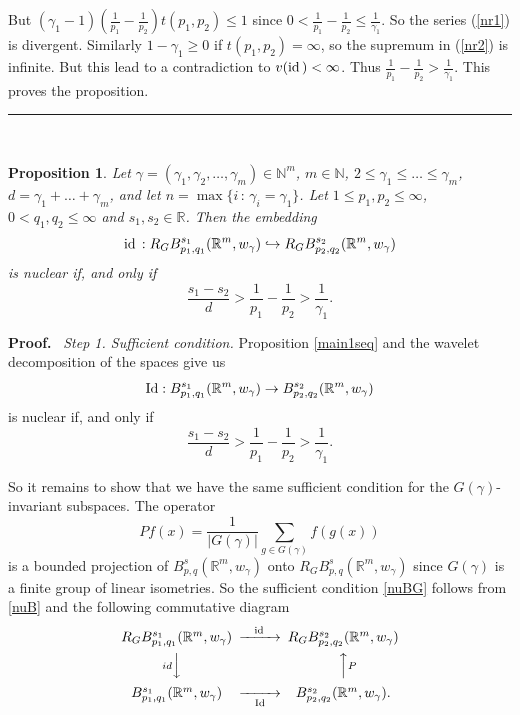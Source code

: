 \documentclass[12pt]{article}
\newtheorem{Prop}{Proposition}
\newcommand{\be}{\begin{equation}}
\newcommand{\ee}{\end{equation}}
\def\id{\mathop{\rm id \,}\nolimits}
\def\Id{\mathop{\rm Id}\nolimits}
\newcommand{\bpr}{{\bf Proof.}\ }
\newcommand{\epr}{\hspace*{\fill}\rule{3mm}{3mm}\\}
\newcommand{\R}{{\mathbb R}}
\newcommand{\N}{{\mathbb N}}
\begin{document}
But $(\gamma_1-1)(\frac{1}{p_1}-\frac{1}{p_2})t(p_1,p_2)\leq 1$ since $0<\frac{1}{p_1}- \frac{1}{p_2}\leq\frac{1}{\gamma_1}$. So the series (\ref{nr1}) is divergent. Similarly $1-\gamma_1\geq 0$ if  $t(p_1,p_2)=\infty$, so the supremum in (\ref{nr2})  is infinite. But this lead to a contradiction to $ v(\id)<\infty$. %
Thus  $\frac{1}{p_1}- \frac{1}{p_2}> \frac{1}{\gamma_1}$.
 This proves the proposition. \epr

\begin{Prop} \label{main1function}
	Let $\gamma= (\gamma_1 , \gamma_2, \ldots , \gamma_m)\in \N^m$, $m\in \N$,   $2\le \gamma_1\le \ldots \le \gamma_m$, %
	$d= \gamma_1+ \ldots + \gamma_m$, and let $n = \max\{ i\,:\, \gamma_i=\gamma_1\}$. 	
	Let $1\le p_1,p_2\le\infty$, $0<q_1,q_2\le \infty$ and  $s_1,s_2\in \R$. Then the embedding 
	\begin{equation*}
	\id :R_G B^{s_1}_{p_1,q_1}(\R^m, w_\gamma) \hookrightarrow R_G B^{s_2}_{p_2,q_2}(\R^m, w_\gamma)
	\end{equation*}
	is nuclear if, and only if
	\be
	\label{nuBG}
 \frac{s_1 - s_2}{d}> \frac{1}{p_1}- \frac{1}{p_2}>\frac{1}{\gamma_{1}}. 
\ee
	
\end{Prop}




\bpr
{\em Step 1.  Sufficient condition.} 
Proposition \ref{main1seq} and the wavelet decomposition of the spaces give us 
	\begin{equation*}
\Id :B^{s_1}_{p_1,q_1}(\R^m, w_\gamma)\rightarrow B^{s_2}_{p_2,q_2}(\R^m, w_\gamma)
\end{equation*}
is nuclear if, and only if
\be
\label{nuB}
 \frac{s_1 - s_2}{d}> \frac{1}{p_1}- \frac{1}{p_2}>\frac{1}{\gamma_{1}}. 
\ee


So it remains to show that we have the same sufficient condition for the $G(\gamma)$-invariant subspaces. The operator 
$$
P f (x)= \frac{1}{|G(\gamma)|}\sum_{g\in G(\gamma)} f(g(x)) 
$$
is a bounded projection of $B^{s}_{p,q}(\R^m, w_\gamma)$ onto $R_G B^{s}_{p,q}(\R^m, w_\gamma)$ since $G(\gamma)$ is a finite group of linear  isometries.  So 
the  sufficient condition \eqref{nuBG} follows from \eqref{nuB} and  the following  commutative diagram 
\begin{equation}\nonumber
\begin{CD}
R_GB^{s_1}_{p_1,q_1}(\R^m, w_\gamma) @ >{\id}>> R_GB^{s_2}_{p_2,q_2}(\R^m, w_\gamma)\\
@V{id}VV                                          @AA{P}A \\
B^{s_1}_{p_1,q_1}(\R^m, w_\gamma) @ >>{\Id}> B^{s_2}_{p_2,q_2}(\R^m, w_\gamma). 
\end{CD}
\end{equation}
\end{document}
